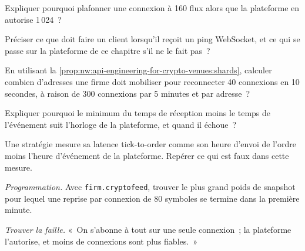 \begin{exercise}[$\star$]\label{exo:nw:api-engineering-for-crypto-venues:2}
Expliquer pourquoi plafonner une connexion à 160 flux alors que la plateforme en autorise 1\,024~?
\end{exercise}

\begin{exercise}[$\star$]\label{exo:nw:api-engineering-for-crypto-venues:3}
Préciser ce que doit faire un client lorsqu'il reçoit un ping WebSocket, et ce qui se passe sur la plateforme de ce chapitre s'il ne le fait pas~?
\end{exercise}

\begin{exercise}[$\star\star$]\label{exo:nw:api-engineering-for-crypto-venues:4}
En utilisant la \cref{prop:nw:api-engineering-for-crypto-venues:shards}, calculer combien d'adresses une firme doit mobiliser pour reconnecter 40 connexions en 10 secondes, à raison de 300
connexions par 5 minutes et par adresse~?
\end{exercise}

\begin{exercise}[$\star\star$]\label{exo:nw:api-engineering-for-crypto-venues:5}
Expliquer pourquoi le minimum du temps de réception moins le temps de l'événement suit l'horloge de la plateforme, et quand il échoue~?
\end{exercise}

\begin{exercise}[$\star\star$]\label{exo:nw:api-engineering-for-crypto-venues:6}
Une stratégie mesure sa latence tick-to-order comme son heure d'envoi de l'ordre moins l'heure d'événement de la plateforme. Repérer ce qui est faux dans cette mesure.
\end{exercise}

\begin{exercise}[$\star\star\star$]\label{exo:nw:api-engineering-for-crypto-venues:7}
\emph{Programmation.} Avec \texttt{firm.cryptofeed}, trouver le plus grand poids de snapshot pour lequel une reprise par connexion de 80 symboles se termine dans la
première minute.
\end{exercise}

\begin{exercise}[$\star\star\star$]\label{exo:nw:api-engineering-for-crypto-venues:8}
\emph{Trouver la faille.} «~On s'abonne à tout sur une seule connexion~; la plateforme l'autorise, et moins de connexions sont plus fiables.~»
\end{exercise}

